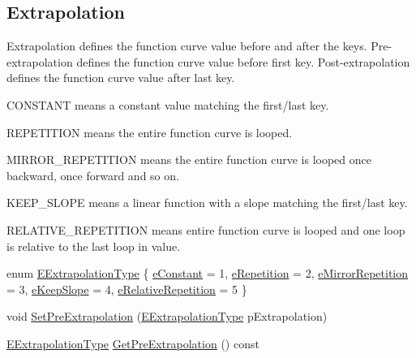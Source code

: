 \subsection*{Extrapolation}
\label{_amgrp6ff40b647a49e8b8e9c36d595e9f288b}%
Extrapolation defines the function curve value before and after the keys. Pre-\/extrapolation defines the function curve value before first key. Post-\/extrapolation defines the function curve value after last key. 
\begin{DoxyItemize}
\item C\+O\+N\+S\+T\+A\+NT means a constant value matching the first/last key. 
\item R\+E\+P\+E\+T\+I\+T\+I\+ON means the entire function curve is looped. 
\item M\+I\+R\+R\+O\+R\+\_\+\+R\+E\+P\+E\+T\+I\+T\+I\+ON means the entire function curve is looped once backward, once forward and so on. 
\item K\+E\+E\+P\+\_\+\+S\+L\+O\+PE means a linear function with a slope matching the first/last key. 
\item R\+E\+L\+A\+T\+I\+V\+E\+\_\+\+R\+E\+P\+E\+T\+I\+T\+I\+ON means entire function curve is looped and one loop is relative to the last loop in value.
\end{DoxyItemize}\begin{DoxyCompactItemize}
\item 
enum \hyperlink{class_fbx_anim_curve_base_aa7214d43daa7b6b9b47a8118a858847f}{E\+Extrapolation\+Type} \{ \newline
\hyperlink{class_fbx_anim_curve_base_aa7214d43daa7b6b9b47a8118a858847fa12ad3ce67324b2ba1391b4c61e6ec8e0}{e\+Constant} = 1, 
\hyperlink{class_fbx_anim_curve_base_aa7214d43daa7b6b9b47a8118a858847fa61ea8cc971ecb3ed4705fa575b1aea8f}{e\+Repetition} = 2, 
\hyperlink{class_fbx_anim_curve_base_aa7214d43daa7b6b9b47a8118a858847fa4ad0cf4dc837a94ee221e76c9bee3edc}{e\+Mirror\+Repetition} = 3, 
\hyperlink{class_fbx_anim_curve_base_aa7214d43daa7b6b9b47a8118a858847fa8081da04891315734b94a6228265c892}{e\+Keep\+Slope} = 4, 
\newline
\hyperlink{class_fbx_anim_curve_base_aa7214d43daa7b6b9b47a8118a858847fa19bd2cf378ff0a41ac2467f186014ca3}{e\+Relative\+Repetition} = 5
 \}
\item 
void \hyperlink{class_fbx_anim_curve_base_abf3ba6c80fe9371be31602eb36789989}{Set\+Pre\+Extrapolation} (\hyperlink{class_fbx_anim_curve_base_aa7214d43daa7b6b9b47a8118a858847f}{E\+Extrapolation\+Type} p\+Extrapolation)
\item 
\hyperlink{class_fbx_anim_curve_base_aa7214d43daa7b6b9b47a8118a858847f}{E\+Extrapolation\+Type} \hyperlink{class_fbx_anim_curve_base_a3d4ba8f60385e14877c370518acea5d3}{Get\+Pre\+Extrapolation} () const

\end{DoxyCompactItemize}
